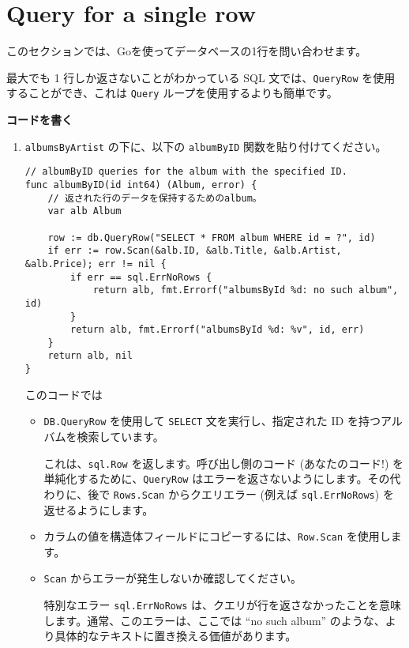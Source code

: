 \section{Query for a single row}

このセクションでは、Goを使ってデータベースの1行を問い合わせます。

最大でも 1 行しか返さないことがわかっている SQL
文では、\texttt{QueryRow} を使用することができ、これは \texttt{Query}
ループを使用するよりも簡単です。

\textbf{コードを書く}

\begin{enumerate}
\item
  \texttt{albumsByArtist} の下に、以下の \texttt{albumByID}
  関数を貼り付けてください。
\begin{lstlisting}[numbers=none]
// albumByID queries for the album with the specified ID.
func albumByID(id int64) (Album, error) {
    // 返された行のデータを保持するためのalbum。
    var alb Album

    row := db.QueryRow("SELECT * FROM album WHERE id = ?", id)
    if err := row.Scan(&alb.ID, &alb.Title, &alb.Artist, &alb.Price); err != nil {
        if err == sql.ErrNoRows {
            return alb, fmt.Errorf("albumsById %d: no such album", id)
        }
        return alb, fmt.Errorf("albumsById %d: %v", id, err)
    }
    return alb, nil
}
\end{lstlisting}


  このコードでは

  \begin{itemize}
  \item
    \texttt{DB.QueryRow} を使用して \texttt{SELECT}
    文を実行し、指定された ID を持つアルバムを検索しています。

    これは、\texttt{sql.Row} を返します。呼び出し側のコード
    (あなたのコード!) を単純化するために、\texttt{QueryRow}
    はエラーを返さないようにします。その代わりに、後で
    \texttt{Rows.Scan} からクエリエラー (例えば \texttt{sql.ErrNoRows})
    を返せるようにします。
  \item
    カラムの値を構造体フィールドにコピーするには、\texttt{Row.Scan}
    を使用します。
  \item
    \texttt{Scan} からエラーが発生しないか確認してください。

    特別なエラー \texttt{sql.ErrNoRows}
    は、クエリが行を返さなかったことを意味します。通常、このエラーは、ここでは
    ``no such album''
    のような、より具体的なテキストに置き換える価値があります。
  \end{itemize}



\end{enumerate}
